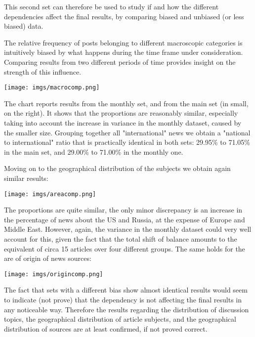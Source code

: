 \documentclass{article}
\begin{document}
This second set can therefore be used to study if and how the different dependencies affect the final results, by comparing biased and unbiased (or less biased) data.

The relative frequency of posts belonging to different macroscopic categories is intuitively biased by what happens during the time frame under consideration. Comparing results from two different periods of time provides insight on the strength of this influence.

\bigskip

\texttt{[image: imgs/macrocomp.png]}

\bigskip

The chart reports results from the monthly set, and from the main set (in small, on the right). It shows that the proportions are reasonably similar, especially taking into account the increase in variance in the monthly dataset, caused by the smaller size. Grouping together all "international" news we obtain a "national to international" ratio that is practically identical in both sets: 29.95\% to 71.05\% in the main set, and 29.00\% to 71.00\% in the monthly one.

\bigskip

Moving on to the geographical distribution of the subjects we obtain again similar results: 

\bigskip

\texttt{[image: imgs/areacomp.png]}

\bigskip

The proportions are quite similar, the only minor discrepancy is an increase in the percentage of news about the US and Russia, at the expense of Europe and Middle East. However, again, the variance in the monthly dataset could very well account for this, given the fact that the total shift of balance amounts to the equivalent of circa 15 articles over four different groups. The same holds for the are of origin of news sources: 

\bigskip

\texttt{[image: imgs/origincomp.png]}

\bigskip

The fact that sets with a different bias show almost identical results would seem to indicate (not prove) that the dependency is not affecting the final results in any noticeable way. Therefore the results regarding the distribution of discussion topics, the geographical distribution of article subjects, and the geographical distribution of sources are at least confirmed, if not proved correct.
\end{document}
